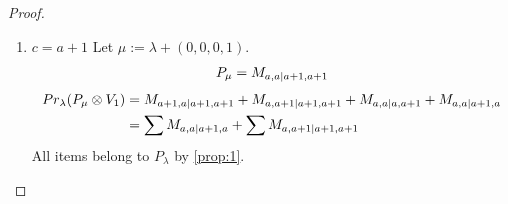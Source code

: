 \begin{proof}
\begin{enumerate}
\begin{enumerate}
\item $c=a+1$
        Let $\mu:=\lambda + (0,0,0,1) $. 
\begin{equation}\notag
  \begin{aligned}
      P_{\mu} =M_{a,a|a+1,a+1}
  \end{aligned}
\end{equation}
\begin{equation}\notag
  \begin{aligned}
  Pr_{\lambda}(P_\mu \otimes V_1) &=
M_{a+1,a|a+1,a+1}
+M_{a,a+1|a+1,a+1}
+M_{a,a|a,a+1}
+M_{a,a|a+1,a} \\
                                  &=
\sum M_{a,a|a+1,a}
+\sum M_{a,a+1|a+1,a+1}
  \end{aligned}
\end{equation}
All items belong to $P_\lambda$ by \cref{prop:1}.
  \end{enumerate}


\end{enumerate}
\end{proof}

